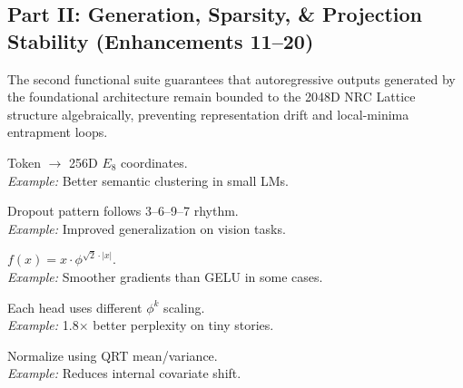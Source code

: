 \subsection{Part II\@: Generation, Sparsity, \& Projection Stability (Enhancements 11--20)}

The second functional suite guarantees that autoregressive outputs generated by the foundational architecture remain bounded to the 2048D NRC Lattice structure algebraically, preventing representation drift and local-minima entrapment loops.

\begin{tcolorbox}[
	enhanced,
	colback=nrccream!85!white,
	colframe=nrcblue,
	boxrule=0.5mm,
	title=\textbf{11. 256D lattice token embeddings}
	]
	Token $\to$ 256D $E_8$ coordinates. \\
	\textit{Example:} Better semantic clustering in small LMs.
\end{tcolorbox}

\begin{tcolorbox}[
	enhanced,
	colback=nrccream!85!white,
	colframe=nrcblue,
	boxrule=0.5mm,
	title=\textbf{12. 3--6--9--7 cycle dropout mask}
	]
	Dropout pattern follows 3--6--9--7 rhythm. \\
	\textit{Example:} Improved generalization on vision tasks.
\end{tcolorbox}

\begin{tcolorbox}[
	enhanced,
	colback=nrccream!85!white,
	colframe=nrcblue,
	boxrule=0.5mm,
	title=\textbf{13. $\phi^{\sqrt{2}}$ activation function}
	]
	$f(x) = x \cdot \phi^{\sqrt{2} \cdot |x|}$. \\
	\textit{Example:} Smoother gradients than GELU in some cases.
\end{tcolorbox}

\begin{tcolorbox}[
	enhanced,
	colback=nrccream!85!white,
	colframe=nrcblue,
	boxrule=0.5mm,
	title=\textbf{14. TTT multi-head $\phi$-tensor contraction}
	]
	Each head uses different $\phi^k$ scaling. \\
	\textit{Example:} 1.8$\times$ better perplexity on tiny stories.
\end{tcolorbox}

\begin{tcolorbox}[
	enhanced,
	colback=nrccream!85!white,
	colframe=nrcblue,
	boxrule=0.5mm,
	title=\textbf{15. QRT layer-norm stabilization}
	]
	Normalize using QRT mean/variance. \\
	\textit{Example:} Reduces internal covariate shift.
\end{tcolorbox}

